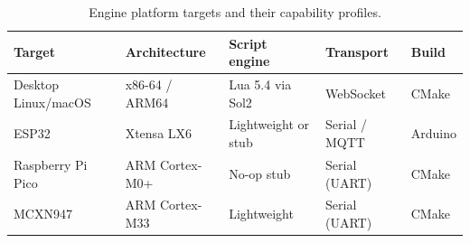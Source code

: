 \begin{table}[!htbp]
  \centering
  \caption{Engine platform targets and their capability profiles.}
  \label{tab:app-platforms}
  \vskip6pt
  \begin{tabularx}{\textwidth}{>{\raggedright\arraybackslash}p{}>{\raggedright\arraybackslash}p{}>{\raggedright\arraybackslash}X>{\raggedright\arraybackslash}p{}>{\raggedright\arraybackslash}p{}}
    \toprule
    Target & Architecture & Script engine & Transport & Build \\
    \midrule
    Desktop Linux/macOS & x86-64 / ARM64 & Lua 5.4 via Sol2    & WebSocket               & CMake \\
    ESP32               & Xtensa LX6     & Lightweight or stub & Serial / MQTT           & Arduino \\
    Raspberry Pi Pico   & ARM Cortex-M0+ & No-op stub          & Serial (UART)           & CMake \\
    MCXN947             & ARM Cortex-M33  & Lightweight         & Serial (UART)           & CMake \\
    \bottomrule
  \end{tabularx}
\end{table}
